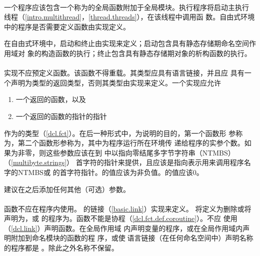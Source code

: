 \paragraph{} %
一个程序应该包含一个称为的全局函数附加于全局模块。执行程序将启动主执行
线程（\ref{intro.multithread}，\ref{thread.threads}），在该线程中调用函
数。自由式环境中的程序是否需要定义函数由实现定义。

\begin{note}
  在自由式环境中，启动和终止由实现来定义；启动包含具有静态存储期命名空间作用域对
  象的构造函数的执行；终止包含具有静态存储期对象的析构函数的执行。
\end{note}

\paragraph{} %
实现不应预定义函数。该函数不得重载。其类型应具有\cpp{}语言链接，并且应
具有一个声明为类型的返回类型，否则其类型由实现来定义。一个实现应允许
\begin{enumerate}
  \item 一个返回的函数\tm{()}，以及
  \item 一个返回的函数的指针的指针\tm{)}
\end{enumerate}
作为的类型（\ref{dcl.fct}）。在后一种形式中，为说明的目的，第一个函数形
参称为，第二个函数形参称为，其中为程序运行所在环境传
递给程序的实参个数。如果为非零，则这些参数应该在到
中以指向零结尾多字节字符串（NTMBS）（\ref{multibyte.strings}）
首字符的指针来提供，且应该是指向表示用来调用程序名字的NTMBS或
的首字符指针。的值应该为非负值。的值应该0。

\begin{note}
  建议在之后添加任何其他（可选）参数。
\end{note}

\paragraph{} %
函数不应在程序内使用。 的链接（\ref{basic.link}）实现来定义。
将定义为删除或将声明为，或
的程序为\illform{}。函数不能是协程（\ref{dcl.fct.def.coroutine}）。不应
使用（\ref{dcl.link}）声明函数。在全局作用域
内声明变量的程序，或在全局作用域内声明附加到命名模块的函数的程
序，或使用\c{}语言链接（在任何命名空间中）声明名称的程序都是\illform{}
。除此之外名称不保留。

